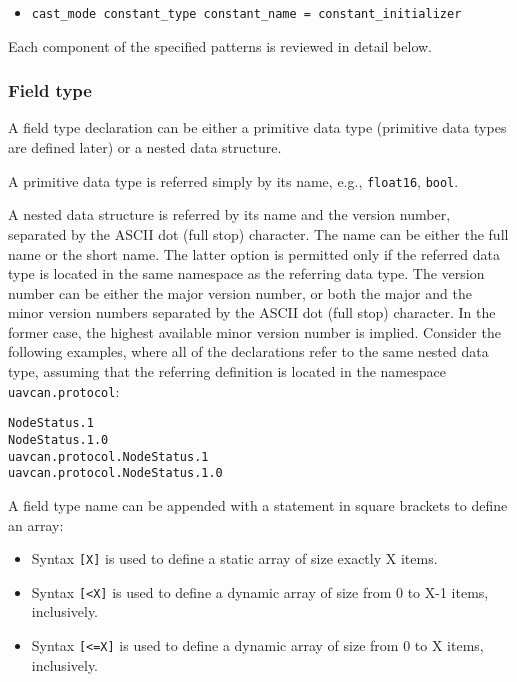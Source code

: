 \begin{itemize}
    \item \verb|cast_mode constant_type constant_name = constant_initializer|
\end{itemize}

Each component of the specified patterns is reviewed in detail below.

\subsubsection{Field type}

A field type declaration can be either a primitive data type
(primitive data types are defined later) or a nested data structure.

A primitive data type is referred simply by its name, e.g., \verb|float16|, \verb|bool|.

A nested data structure is referred by its name and the version number,
separated by the ASCII dot (full stop) character.
The name can be either the full name or the short name.
The latter option is permitted only if the referred data type is located in the same namespace as
the referring data type.
The version number can be either the major version number, or both the major and the minor version
numbers separated by the ASCII dot (full stop) character.
In the former case, the highest available minor version number is implied.
Consider the following examples,
where all of the declarations refer to the same nested data type, assuming that the referring definition is
located in the namespace \verb|uavcan.protocol|:

\begin{verbatim}
NodeStatus.1
NodeStatus.1.0
uavcan.protocol.NodeStatus.1
uavcan.protocol.NodeStatus.1.0
\end{verbatim}

A field type name can be appended with a statement in square brackets to define an array:

\begin{itemize}
    \item Syntax \verb|[X]| is used to define a static array of size exactly X items.
    \item Syntax \verb|[<X]| is used to define a dynamic array of size from 0 to X-1 items, inclusively.
    \item Syntax \verb|[<=X]| is used to define a dynamic array of size from 0 to X items, inclusively.
\end{itemize}

